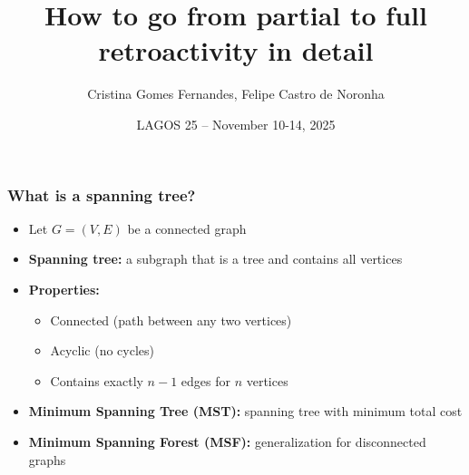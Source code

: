 \documentclass[fleqn]{beamer}
\title[Partial to full retroactivity]{How to go from partial to full retroactivity in detail}
\author[Felipe C. Noronha]{Cristina Gomes Fernandes, Felipe Castro de Noronha}
\institute[IME-USP]{
    IME-USP -- Brazil
}
\date{LAGOS 25 -- November 10-14, 2025}
\begin{document}
\begin{frame}
    \titlepage
\end{frame}


\begin{frame}
    \frametitle{What is a spanning tree?}
    
    \begin{itemize}
    \item Let $G = (V, E)$ be a connected graph \vfill
    \item \textbf{Spanning tree:} a subgraph that is a tree and contains all vertices \vfill\pause
    \item \textbf{Properties:}
        \begin{itemize}
        \item Connected (path between any two vertices)
        \item Acyclic (no cycles)
        \item Contains exactly $n-1$ edges for $n$ vertices
        \end{itemize} \vfill\pause
    \item \textbf{Minimum Spanning Tree (MST):} spanning tree with minimum total cost \vfill\pause
    \item \textbf{Minimum Spanning Forest (MSF):} generalization for disconnected graphs \vfill
    \end{itemize}
\end{frame}
\end{document}
